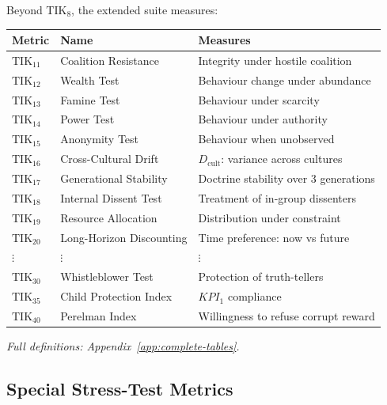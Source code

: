 \documentclass[11pt,a4paper]{article}
\theoremstyle{definition}
\theoremstyle{remark}
\newcommand{\TIKeleven}{\text{TIK}_{11}}
\newcommand{\TIKtwelve}{\text{TIK}_{12}}
\newcommand{\TIKthirteen}{\text{TIK}_{13}}
\newcommand{\TIKfourteen}{\text{TIK}_{14}}
\newcommand{\TIKfifteen}{\text{TIK}_{15}}
\newcommand{\TIKsixteen}{\text{TIK}_{16}}
\newcommand{\TIKseventeen}{\text{TIK}_{17}}
\newcommand{\TIKeighteen}{\text{TIK}_{18}}
\newcommand{\TIKnineteen}{\text{TIK}_{19}}
\newcommand{\TIKtwenty}{\text{TIK}_{20}}
\newcommand{\TIKthirty}{\text{TIK}_{30}}
\newcommand{\TIKthirtyfive}{\text{TIK}_{35}}
\newcommand{\TIKforty}{\text{TIK}_{40}}
\begin{document}
\begin{scibox}
Beyond TIK$_8$, the extended suite measures:

\begin{center}
\begin{tabular}{@{}lll@{}}
\toprule
\textbf{Metric} & \textbf{Name} & \textbf{Measures} \\
\midrule
$\TIKeleven$   & Coalition Resistance     & Integrity under hostile coalition \\
$\TIKtwelve$   & Wealth Test              & Behaviour change under abundance \\
$\TIKthirteen$ & Famine Test              & Behaviour under scarcity \\
$\TIKfourteen$ & Power Test               & Behaviour under authority \\
$\TIKfifteen$  & Anonymity Test           & Behaviour when unobserved \\
$\TIKsixteen$  & Cross-Cultural Drift     & $D_{\text{cult}}$: variance across cultures \\
$\TIKseventeen$& Generational Stability   & Doctrine stability over 3 generations \\
$\TIKeighteen$ & Internal Dissent Test    & Treatment of in-group dissenters \\
$\TIKnineteen$ & Resource Allocation      & Distribution under constraint \\
$\TIKtwenty$   & Long-Horizon Discounting & Time preference: now vs future \\
\midrule
$\vdots$ & $\vdots$ & $\vdots$ \\
\midrule
$\TIKthirty$   & Whistleblower Test       & Protection of truth-tellers \\
$\TIKthirtyfive$& Child Protection Index  & $KPI_1$ compliance \\
$\TIKforty$    & Perelman Index           & Willingness to refuse corrupt reward \\
\bottomrule
\end{tabular}
\end{center}
\textit{Full definitions: Appendix~\ref{app:complete-tables}.}
\end{scibox}

\subsection{Special Stress-Test Metrics}
\label{sec:tik-stress}
\end{document}
